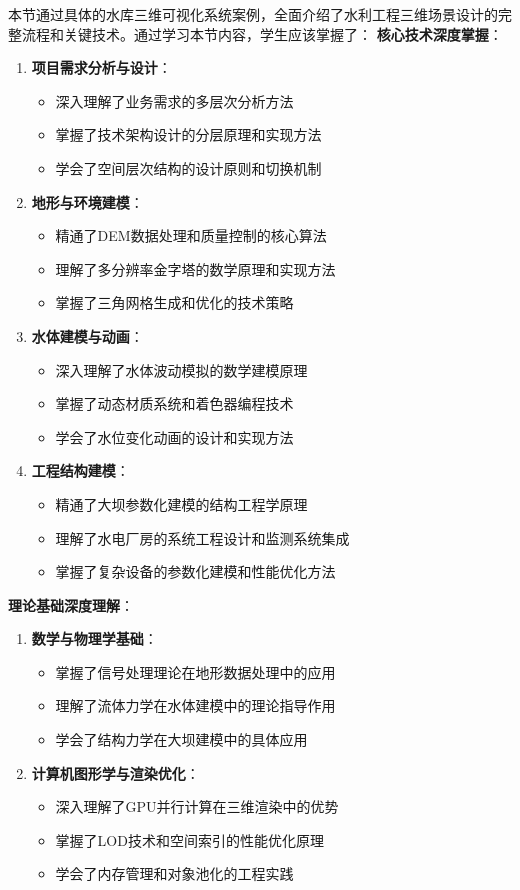 本节通过具体的水库三维可视化系统案例，全面介绍了水利工程三维场景设计的完整流程和关键技术。通过学习本节内容，学生应该掌握了： \textbf{核心技术深度掌握}： \begin{enumerate}
\def\labelenumi{\arabic{enumi}.} \tightlist \item \textbf{项目需求分析与设计}： \begin{itemize} \tightlist \item 深入理解了业务需求的多层次分析方法
\item 掌握了技术架构设计的分层原理和实现方法 \item 学会了空间层次结构的设计原则和切换机制 \end{itemize} \item \textbf{地形与环境建模}： \begin{itemize} \tightlist
\item 精通了DEM数据处理和质量控制的核心算法 \item 理解了多分辨率金字塔的数学原理和实现方法 \item 掌握了三角网格生成和优化的技术策略 \end{itemize} \item \textbf{水体建模与动画}：
\begin{itemize} \tightlist \item 深入理解了水体波动模拟的数学建模原理 \item 掌握了动态材质系统和着色器编程技术 \item 学会了水位变化动画的设计和实现方法 \end{itemize} \item
\textbf{工程结构建模}： \begin{itemize} \tightlist \item 精通了大坝参数化建模的结构工程学原理 \item 理解了水电厂房的系统工程设计和监测系统集成 \item
掌握了复杂设备的参数化建模和性能优化方法 \end{itemize} \end{enumerate} \textbf{理论基础深度理解}： \begin{enumerate} \def\labelenumi{\arabic{enumi}.}
\tightlist \item \textbf{数学与物理学基础}： \begin{itemize} \tightlist \item 掌握了信号处理理论在地形数据处理中的应用 \item 理解了流体力学在水体建模中的理论指导作用
\item 学会了结构力学在大坝建模中的具体应用 \end{itemize} \item \textbf{计算机图形学与渲染优化}： \begin{itemize} \tightlist \item
深入理解了GPU并行计算在三维渲染中的优势 \item 掌握了LOD技术和空间索引的性能优化原理 \item 学会了内存管理和对象池化的工程实践 \end{itemize} \end{enumerate}
